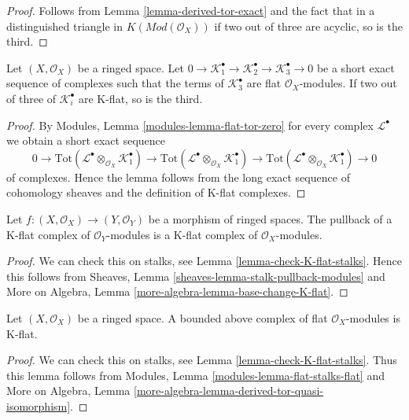 \begin{proof}
Follows from
Lemma \ref{lemma-derived-tor-exact}
and the fact that in a distinguished triangle in
$K(\textit{Mod}(\mathcal{O}_X))$
if two out of three are acyclic, so is the third.
\end{proof}

\begin{lemma}
\label{lemma-K-flat-two-out-of-three-ses}
Let $(X, \mathcal{O}_X)$ be a ringed space. Let
$0 \to \mathcal{K}_1^\bullet \to \mathcal{K}_2^\bullet \to
\mathcal{K}_3^\bullet \to 0$ be a short exact sequence of complexes
such that the terms of $\mathcal{K}_3^\bullet$ are flat $\mathcal{O}_X$-modules.
If two out of three of $\mathcal{K}_i^\bullet$ are K-flat, so is the third.
\end{lemma}

\begin{proof}
By Modules, Lemma \ref{modules-lemma-flat-tor-zero}
for every complex $\mathcal{L}^\bullet$
we obtain a short exact sequence
$$
0 \to
\text{Tot}(\mathcal{L}^\bullet \otimes_{\mathcal{O}_X} \mathcal{K}_1^\bullet)
\to
\text{Tot}(\mathcal{L}^\bullet \otimes_{\mathcal{O}_X} \mathcal{K}_1^\bullet)
\to
\text{Tot}(\mathcal{L}^\bullet \otimes_{\mathcal{O}_X} \mathcal{K}_1^\bullet)
\to 0
$$
of complexes. Hence the lemma follows from the long exact sequence of
cohomology sheaves and the definition of K-flat complexes.
\end{proof}

\begin{lemma}
\label{lemma-pullback-K-flat}
Let $f : (X, \mathcal{O}_X) \to (Y, \mathcal{O}_Y)$ be a morphism of
ringed spaces. The pullback of a K-flat complex of $\mathcal{O}_Y$-modules
is a K-flat complex of $\mathcal{O}_X$-modules.
\end{lemma}

\begin{proof}
We can check this on stalks, see
Lemma \ref{lemma-check-K-flat-stalks}.
Hence this follows from
Sheaves, Lemma \ref{sheaves-lemma-stalk-pullback-modules}
and
More on Algebra, Lemma \ref{more-algebra-lemma-base-change-K-flat}.
\end{proof}

\begin{lemma}
\label{lemma-bounded-flat-K-flat}
Let $(X, \mathcal{O}_X)$ be a ringed space. A bounded above complex
of flat $\mathcal{O}_X$-modules is K-flat.
\end{lemma}

\begin{proof}
We can check this on stalks, see
Lemma \ref{lemma-check-K-flat-stalks}.
Thus this lemma follows from
Modules, Lemma \ref{modules-lemma-flat-stalks-flat}
and
More on Algebra, Lemma \ref{more-algebra-lemma-derived-tor-quasi-isomorphism}.
\end{proof}

